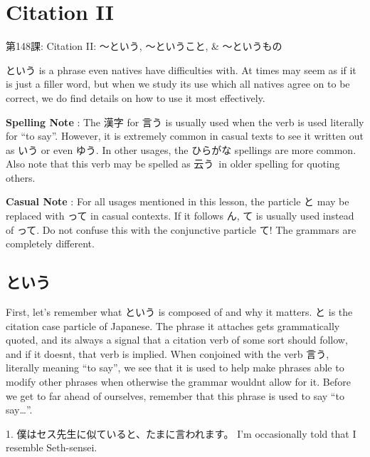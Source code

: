     
\chapter{Citation II}

\begin{center}
\begin{Large}
第148課: Citation II: ～という, ～ということ, \& ～というもの 
\end{Large}
\end{center}
 
\par{ という is a phrase even natives have difficulties with. At times may seem as if it is just a filler word, but when we study its use which all natives agree on to be correct, we do find details on how to use it most effectively. }

\par{\textbf{Spelling Note }: The 漢字 for 言う is usually used when the verb is used literally for “to say”. However, it is extremely common in casual texts to see it written out as いう or even ゆう. In other usages, the ひらがな spellings are more common. Also note that this verb may be spelled as 云う in older spelling for quoting others. }
 
\par{\textbf{Casual Note }: For all usages mentioned in this lesson, the particle と may be replaced with って in casual contexts. If it follows ん, て is usually used instead of って. Do not confuse this with the conjunctive particle て! The grammars are completely different. }
      
\section{という}
 
\par{ First, let's remember what という is composed of and why it matters. と is the citation case particle of Japanese. The phrase it attaches gets grammatically quoted, and it\textquotesingle s always a signal that a citation verb of some sort should follow, and if it doesn\textquotesingle t, that verb is implied. When conjoined with the verb 言う, literally meaning “to say”, we see that it is used to help make phrases able to modify other phrases when otherwise the grammar wouldn\textquotesingle t allow for it. Before we get to far ahead of ourselves, remember that this phrase is used to say “to say…”. }

\par{1. 僕はセス先生に似ていると、たまに言われます。 \hfill\break
I'm occasionally told that I resemble Seth-sensei. }

